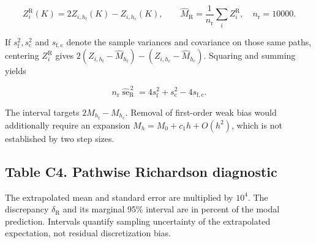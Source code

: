 \documentclass[11pt,a4paper]{article}
\begin{document}
\[
Z_i^{\mathrm{R}}(K)=2Z_{i,h_{\mathrm{f}}}(K)-Z_{i,h_{\mathrm{c}}}(K),\qquad
\widehat M_{\mathrm{R}}=\frac1{n_{\mathrm{r}}}\sum_i Z_i^{\mathrm{R}},\quad n_{\mathrm{r}}=10000. \tag{E09}
\]

If \(s_{\mathrm{f}}^2,s_{\mathrm{c}}^2\) and
\(s_{{\mathrm{f}},{\mathrm{c}}}\) denote the sample variances and
covariance on those same paths, centering \(Z_i^{\mathrm{R}}\) gives
\(2(Z_{i,h_{\mathrm{f}}}-\widehat M_{h_{\mathrm{f}}})-(Z_{i,h_{\mathrm{c}}}-\widehat M_{h_{\mathrm{c}}})\).
Squaring and summing yields

\[
n_{\mathrm{r}}\widehat{\operatorname{se}}_{\mathrm{R}}^{\,2}
=4s_{\mathrm{f}}^2+s_{\mathrm{c}}^2-4s_{{\mathrm{f}},{\mathrm{c}}}. \tag{E10}
\]

The interval targets \(2M_{h_{\mathrm{f}}}-M_{h_{\mathrm{c}}}\). Removal
of first-order weak bias would additionally require an expansion
\(M_h=M_0+c_1h+O(h^2)\), which is not established by two step sizes.

\subsection{Table C4. Pathwise Richardson diagnostic}\label{table-c4}

The extrapolated mean and standard error are multiplied by \(10^4\). The
discrepancy \(\delta_{\mathrm{R}}\) and its marginal 95\% interval are
in percent of the modal prediction. Intervals quantify sampling
uncertainty of the extrapolated expectation, not residual discretization
bias.
\end{document}
